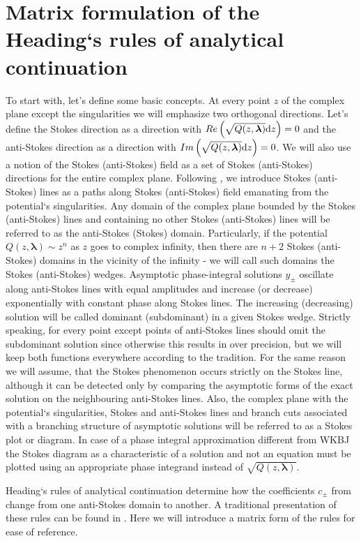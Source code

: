\documentclass[12pt]{iopart}
\def\lmbd{\bm{\lambda}}
\begin{document}
\section{Matrix formulation of the Heading`s rules of analytical continuation \label{sec:mtrxfrm}}
To start with, let's define some basic concepts. At every point $z$ of the complex plane except the singularities we will emphasize two orthogonal directions. Let's define the Stokes direction 
as a direction with $Re \left( \sqrt{Q(z,\lmbd)} \rmd z \right)=0$ and the anti-Stokes direction 
as a direction with $Im \left( \sqrt{Q(z,\lmbd)} \rmd z \right)=0$. We will also use a notion of the Stokes (anti-Stokes) field as a set of Stokes (anti-Stokes) directions for the entire complex plane. Following \cite{heading, white}, we introduce Stokes (anti-Stokes) lines as a paths along Stokes (anti-Stokes) field emanating from the potential`s singularities. Any domain of the complex plane bounded by the Stokes (anti-Stokes) lines and containing no other Stokes (anti-Stokes) lines will be referred to as the anti-Stokes (Stokes) domain. Particularly, if the potential $Q(z,\lmbd) \sim z^n$ as $z$ goes to complex infinity, then there are $n+2$ Stokes (anti-Stokes) domains in the vicinity of the infinity - we will call such domains the Stokes (anti-Stokes) wedges. Asymptotic phase-integral solutions $y_\pm$  oscillate along anti-Stokes lines with equal amplitudes and increase (or decrease) exponentially with constant phase along Stokes lines. The increasing (decreasing) solution will be called dominant (subdominant) in a given Stokes wedge. Strictly speaking, for every point except points of anti-Stokes lines should omit the subdominant solution since otherwise this results in over precision, but we will keep both functions everywhere according to the tradition. For the same reason we will assume, that the Stokes phenomenon occurs strictly on the Stokes line, although it can be detected only by comparing the asymptotic forms of the exact solution on the neighbouring anti-Stokes lines. Also, the complex plane with the potential`s singularities, Stokes and anti-Stokes lines and branch cuts associated with a branching structure of asymptotic solutions  will be referred to as a Stokes plot or diagram. In case of a phase integral approximation different from WKBJ the Stokes diagram as a characteristic of a solution and not an equation must be plotted using an appropriate phase integrand instead of $\sqrt{Q(z,\lmbd)}$.

Heading`s rules of analytical continuation determine how the coefficients $c_\pm$ from  change from one anti-Stokes domain to another. A traditional presentation of these rules can be found in \cite{heading, white}. Here we will introduce a matrix form of the rules for ease of reference.
\end{document}
